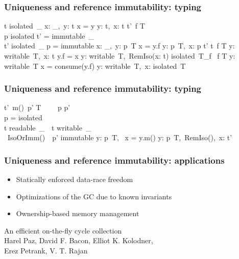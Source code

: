 \begin{frame}
    \frametitle{Uniqueness and reference immutability: typing}
    \infrule
    {
        t \neq isolated\ \_
    }
    {
        x: \_,\ y: t \ts x = y \rts y: t,\ x: t
    }
    \infrule
    {
        t'\ f \in T \\
        p \neq isolated \vee t' = immutable\ \_ \\
        t' \neq isolated\ \_ \vee p = immutable
    }
    {
        x: \_,\ y: p\ T
        \ts x = y.f
        \rts y: p\ T,\ x: p \triangleright t'
    }
    \infrule
    {
        t\ f \in T
    }
    {
        y: writable\ T,\ x: t
        \ts y.f = x
        \rts y: writable\ T,\ RemIso(x: t)
    }
    \infrule
    {
        isolated\ T_f \ f \in T
    }
    {
        y: writable\ T
        \ts x = consume(y.f)
        \rts y: writable\ T,\ x: isolated\ T
    }
\end{frame}

\begin{frame}
    \frametitle{Uniqueness and reference immutability: typing}
    \infrule
    {
        t'\ m()\ p' \in T \ \ \ \
        \ts p \prec p' \ \ \ \
         \\
        p = isolated \Rightarrow \\
                 t \neq readable\ \_\
        \wedge\  t \neq writable\ \_\\
        \wedge\  IsoOrImm(\seq{z: t})\
        \wedge\  p' \neq immutable
    }
    {
        y: p\ T,\ \seq{z: u}
        \ts x = y.m(\seq{z})
        \rts y: p\ T,\ RemIso(),\ x: t'
    }
\end{frame}

\begin{frame}
    \frametitle{Uniqueness and reference immutability: applications}

    \begin{itemize}
        \item Statically enforced data-race freedom
        \item Optimizations of the GC due to known invariants
        \item Ownership-based memory management
    \end{itemize}
\end{frame}

\begin{frame}
    \begin{center}
        {\LARGE An efficient on-the-fly cycle collection} \\
        \vspace{20pt}
        Harel Paz, David F. Bacon, Elliot K. Kolodner,\\
        Erez Petrank, V. T. Rajan
    \end{center}
\end{frame}

